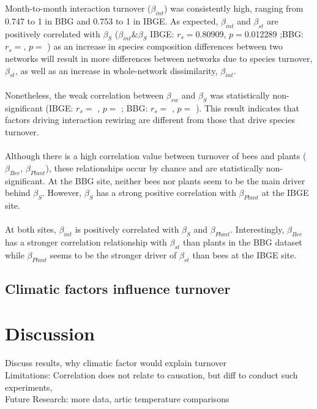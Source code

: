 \documentclass[11pt]{article}
\begin{document}
Month-to-month interaction turnover ($\beta_{int}$) was consistently high, ranging from 0.747 to 1 in BBG and 0.753 to 1 in IBGE. As expected, $\beta_{int}$ and $\beta_{st}$ are positively correlated with $\beta_{S}$ ($\beta_{int}\&\beta_{S}$ IBGE: $r_{s}=$0.80909, $p=$0.012289 ;BBG: $r_{s}=$, $p=$ ) as an increase in species composition differences between two networks will result in more differences between networks due to species turnover, $\beta_{st}$, as well as an increase in whole-network dissimilarity, $\beta_{int}$. \\
\\
Nonetheless, the weak correlation between $\beta_{rw}$ and $\beta_{S}$ was statistically non-significant (IBGE: $r_{s}=$ , $p=$ ; BBG: $r_{s}=$ , $p=$ ). This result indicates that factors driving interaction rewiring are different from those that drive species turnover. \\
\\
Although there is a high correlation value between turnover of bees and plants ($\beta_{Bee}$, $\beta_{Plant}$), these relationships occur by chance and are statistically non-significant. At the BBG site, neither bees nor plants seem to be the main driver behind $\beta_{S}$. However, $\beta_{S}$ has a strong positive correlation with $\beta_{Plant}$ at the IBGE site.\\
\\
At both sites, $\beta_{int}$ is positively correlated with $\beta_{S}$ and $\beta_{Plant}$. Interestingly, $\beta_{Bee}$ has a stronger correlation relationship with $\beta_{st}$ than plants in the BBG dataset while $\beta_{Plant}$ seems to be the stronger driver of $\beta_{st}$ than bees at the IBGE site.


\subsection{Climatic factors influence turnover}


\newpage
\section{Discussion} %
Discuss results, why climatic factor would explain turnover \\
Limitations: Correlation does not relate to causation, but diff to conduct such experiments,  \\
Future Research: more data, artic temperature comparisons \\
\end{document}
